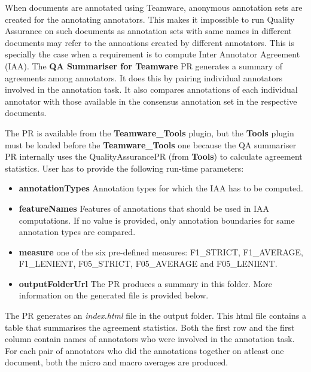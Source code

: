 
When documents are annotated using Teamware, anonymous annotation sets are 
created for the annotating annotators. This makes it impossible to run Quality 
Assurance on such documents as annotation sets with same names in different 
documents may refer to the annoations created by different annotators. This is 
specially the case when a requirement is to compute Inter Annotator Agreement 
(IAA). The \textbf{QA Summariser for Teamware} PR generates a summary of 
agreements among annotators. It does this by pairing individual annotators 
involved in the annotation task. It also compares annotations of each individual
annotator with those available in the consensus annotation set in the respective
documents.

The PR is available from the \textbf{Teamware\_Tools} plugin, but the
\textbf{Tools} plugin must be loaded before the \textbf{Teamware\_Tools} one
because the QA summariser PR internally uses the QualityAssurancePR (from
\textbf{Tools}) to calculate agreement statistics.  User has to provide the
following run-time parameters:

\begin{itemize}
\item \textbf{annotationTypes}  Annotation types for which the IAA has to be 
  computed.
\item \textbf{featureNames}  Features of annotations that should be used in IAA 
  computations. If no value is provided, only annotation boundaries for same
  annotation types are compared.
\item \textbf{measure}
  one of the six pre-defined measures: F1\_STRICT, F1\_AVERAGE,
F1\_LENIENT, F05\_STRICT, F05\_AVERAGE and F05\_LENIENT.
\item \textbf{outputFolderUrl}
  The PR produces a summary in this folder.  More information on the generated
  file is provided below.
\end{itemize}

The PR generates an \textit{index.html} file in the output folder. This html 
file contains a table that summarises the agreement statistics.  Both the first 
row and the first column contain names of annotators who were involved in the 
annotation task.  For each pair of annotators who did the annotations together 
on atleast one document, both the micro and macro averages are produced. 

